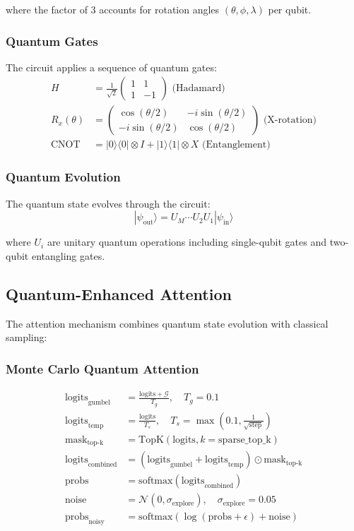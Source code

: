 \documentclass{article}
\begin{document}
where the factor of 3 accounts for rotation angles $(\theta, \phi, \lambda)$ per qubit.

\subsubsection{Quantum Gates}
The circuit applies a sequence of quantum gates:
\begin{align*}
H &= \frac{1}{\sqrt{2}}\begin{pmatrix} 1 & 1 \\ 1 & -1 \end{pmatrix} \text{ (Hadamard)} \\
R_x(\theta) &= \begin{pmatrix} \cos(\theta/2) & -i\sin(\theta/2) \\ -i\sin(\theta/2) & \cos(\theta/2) \end{pmatrix} \text{ (X-rotation)} \\
\text{CNOT} &= |0\rangle\langle0| \otimes I + |1\rangle\langle1| \otimes X \text{ (Entanglement)}
\end{align*}

\subsubsection{Quantum Evolution}
The quantum state evolves through the circuit:
\begin{equation}
|\psi_{\text{out}}\rangle = U_M\cdots U_2U_1|\psi_{\text{in}}\rangle
\end{equation}

where $U_i$ are unitary quantum operations including single-qubit gates and two-qubit entangling gates.

\subsection{Quantum-Enhanced Attention}
The attention mechanism combines quantum state evolution with classical sampling:

\subsubsection{Monte Carlo Quantum Attention}
\begin{align*}
\text{logits}_{\text{gumbel}} &= \frac{\text{logits} + \mathcal{G}}{T_g}, \quad T_g = 0.1 \\
\text{logits}_{\text{temp}} &= \frac{\text{logits}}{T_s}, \quad T_s = \max(0.1, \frac{1}{\sqrt{\text{step}}}) \\
\text{mask}_{\text{top-k}} &= \text{TopK}(\text{logits}, k=\text{sparse\_top\_k}) \\
\text{logits}_{\text{combined}} &= (\text{logits}_{\text{gumbel}} + \text{logits}_{\text{temp}}) \odot \text{mask}_{\text{top-k}} \\
\text{probs} &= \text{softmax}(\text{logits}_{\text{combined}}) \\
\text{noise} &= \mathcal{N}(0, \sigma_{\text{explore}}), \quad \sigma_{\text{explore}} = 0.05 \\
\text{probs}_{\text{noisy}} &= \text{softmax}(\log(\text{probs} + \epsilon) + \text{noise})
\end{align*}
\end{document}
